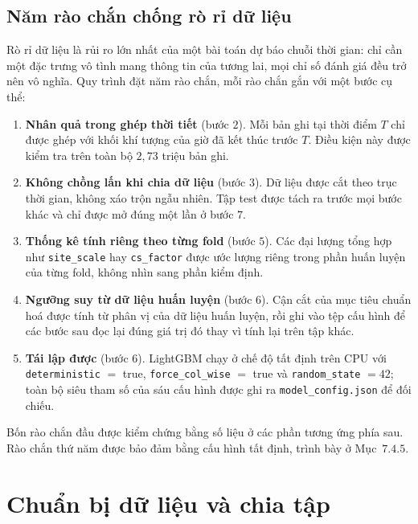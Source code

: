 \documentclass[12pt, a4paper]{report}
\begin{document}
\FloatBarrier
\subsection{Năm rào chắn chống rò rỉ dữ liệu}

Rò rỉ dữ liệu là rủi ro lớn nhất của một bài toán dự báo chuỗi thời gian: chỉ cần một
đặc trưng vô tình mang thông tin của tương lai, mọi chỉ số đánh giá đều trở nên vô
nghĩa. Quy trình đặt năm rào chắn, mỗi rào chắn gắn với một bước cụ thể:

\begin{enumerate}
    \item \textbf{Nhân quả trong ghép thời tiết} (bước $2$). Mỗi bản ghi tại thời điểm
    $T$ chỉ được ghép với khối khí tượng của giờ đã kết thúc trước $T$. Điều kiện này
    được kiểm tra trên toàn bộ $2{,}73$ triệu bản ghi.

    \item \textbf{Không chồng lấn khi chia dữ liệu} (bước $3$). Dữ liệu được cắt theo
    trục thời gian, không xáo trộn ngẫu nhiên. Tập test được tách ra trước mọi bước
    khác và chỉ được mở đúng một lần ở bước $7$.

    \item \textbf{Thống kê tính riêng theo từng fold} (bước $5$). Các đại lượng tổng
    hợp như \texttt{site\_scale} hay \texttt{cs\_factor} được ước lượng riêng trong
    phần huấn luyện của từng fold, không nhìn sang phần kiểm định.

    \item \textbf{Ngưỡng suy từ dữ liệu huấn luyện} (bước $6$). Cận cắt của mục tiêu
    chuẩn hoá được tính từ phân vị của dữ liệu huấn luyện, rồi ghi vào tệp cấu hình để
    các bước sau đọc lại đúng giá trị đó thay vì tính lại trên tập khác.

    \item \textbf{Tái lập được} (bước $6$). LightGBM chạy ở chế độ tất định trên CPU với
    \texttt{deterministic} $=$ true, \texttt{force\_col\_wise} $=$ true và
    \texttt{random\_state} $=42$; toàn bộ siêu tham số của sáu cấu hình được ghi ra
    \texttt{model\_config.json} để đối chiếu.
\end{enumerate}

Bốn rào chắn đầu được kiểm chứng bằng số liệu ở các phần tương ứng phía sau. Rào chắn
thứ năm được bảo đảm bằng cấu hình tất định, trình bày ở Mục~$7.4.5$.

\FloatBarrier
\section{Chuẩn bị dữ liệu và chia tập}
\end{document}
